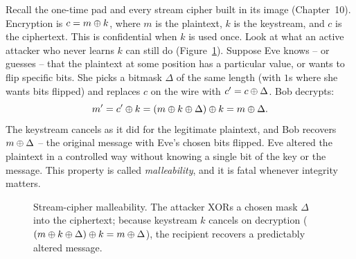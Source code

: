 Recall the one-time pad and every stream cipher built in its image (Chapter~10). Encryption is $c = m \oplus k$, where $m$ is the plaintext, $k$ is the keystream, and $c$ is the ciphertext. This is confidential when $k$ is used once. Look at what an active attacker who never learns $k$ can still do (Figure~\ref{ch16:malleability-fig}). Suppose Eve knows -- or guesses -- that the plaintext at some position has a particular value, or wants to flip specific bits. She picks a bitmask $\Delta$ of the same length (with $1$s where she wants bits flipped) and replaces $c$ on the wire with $c' = c \oplus \Delta$. Bob decrypts:
\[
m' = c' \oplus k = (m \oplus k \oplus \Delta) \oplus k = m \oplus \Delta.
\]
The keystream cancels as it did for the legitimate plaintext, and Bob recovers $m \oplus \Delta$ -- the original message with Eve's chosen bits flipped. Eve altered the plaintext in a controlled way without knowing a single bit of the key or the message. This property is called \emph{malleability}, and it is fatal whenever integrity matters.

\begin{figure}[htbp]
\centering
{}
\caption{Stream-cipher malleability. The attacker XORs a chosen mask $\Delta$ into the ciphertext; because keystream $k$ cancels on decryption ($(m \oplus k \oplus \Delta) \oplus k = m \oplus \Delta$), the recipient recovers a predictably altered message.}
\label{ch16:malleability-fig}
\end{figure}

